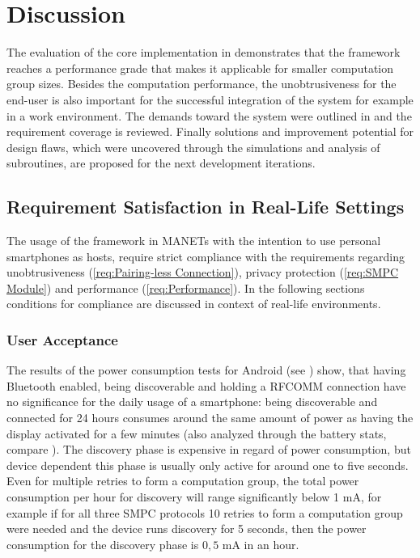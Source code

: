 \FloatBarrier

\chapter{Discussion} \label{Discussion}

The evaluation of the core implementation in  demonstrates that the framework reaches a performance grade that makes it applicable for smaller computation group sizes. Besides the computation performance, the unobtrusiveness for the end-user is also important for the successful integration of the system for example in a work environment. The demands toward the system were outlined in  and the requirement coverage is reviewed.
Finally solutions and improvement potential for design flaws, which were uncovered through the simulations and analysis of subroutines, are proposed for the next development iterations.

\section{Requirement Satisfaction in Real-Life Settings} \label{Requirement Satisfaction in Real-Life Settings}

The usage of the framework in \glspl{MANET} with the intention to use personal smartphones as hosts, require strict compliance with the requirements regarding unobtrusiveness (\ref{req:Pairing-less Connection}), privacy protection (\ref{req:SMPC Module}) and performance (\ref{req:Performance}). In the following sections conditions for compliance are discussed in context of real-life environments.

\subsection{User Acceptance}
The results of the power consumption tests for Android (see ) show, that having Bluetooth enabled, being discoverable and holding a \gls{RFCOMM} connection have no significance for the daily usage of a smartphone: being discoverable and connected for 24 hours consumes around the same amount of power as having the display activated for a few minutes (also analyzed through the battery stats, compare ). 
The discovery phase is expensive in regard of power consumption, but device dependent this phase is usually only active for around one to five seconds. Even for multiple retries to form a computation group, the total power consumption per hour for discovery will range significantly below 1 mA, for example if for all three \gls{SMPC} protocols 10 retries to form a computation group were needed and the device runs discovery for 5 seconds, then the power consumption for the discovery phase is $0,5$ mA in an hour. 

